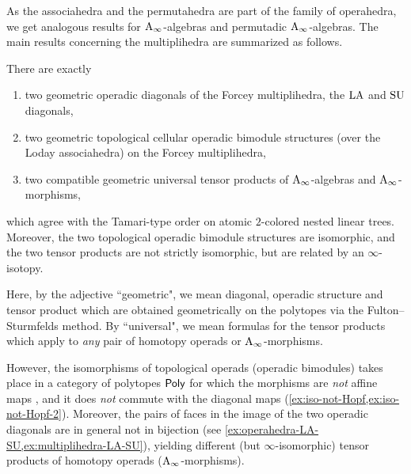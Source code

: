 As the associahedra and the permutahedra are part of the family of operahedra, we get analogous results for $\mathrm{A}_\infty$-algebras and permutadic $\mathrm{A}_\infty$-algebras. 
The main results concerning the multiplihedra are summarized as follows. 

\begin{theorem*}
	There are exactly 
	\begin{enumerate}
	\item two geometric operadic diagonals of the Forcey multiplihedra, the $\mathrm{LA}$ and $\mathrm{SU}$ diagonals,
	\item two geometric topological cellular operadic bimodule structures (over the Loday associahedra) on the Forcey multiplihedra,
	\item two compatible geometric universal tensor products of $\mathrm{A}_\infty$-algebras and $\mathrm{A}_\infty$-morphisms,
	\end{enumerate}
	which agree with the Tamari-type order on atomic $2$-colored nested linear trees. 
	Moreover, the two topological operadic bimodule structures are isomorphic, and the two tensor products are not strictly isomorphic, but are related by an $\infty$-isotopy. 
\end{theorem*}

Here, by the adjective ``geometric", we mean diagonal, operadic structure and tensor product which are obtained geometrically on the polytopes via the Fulton--Sturmfelds method. 
By ``universal", we mean formulas for the tensor products which apply to \emph{any} pair of homotopy operads or $\mathrm{A}_\infty$-morphisms.

However, the isomorphisms of topological operads (\resp operadic bimodules) takes place in a category of polytopes $\mathsf{Poly}$ for which the morphisms are \emph{not} affine maps \cite[Def. 4.13]{LaplanteAnfossi}, and it does \emph{not} commute with the diagonal maps (\cref{ex:iso-not-Hopf,ex:iso-not-Hopf-2}).
Moreover, the pairs of faces in the image of the two operadic diagonals are in general not in bijection (see \cref{ex:operahedra-LA-SU,ex:multiplihedra-LA-SU}), yielding different (but $\infty$-isomorphic) tensor products of homotopy operads (\resp \mbox{$\mathrm{A}_\infty$-morphisms}).
